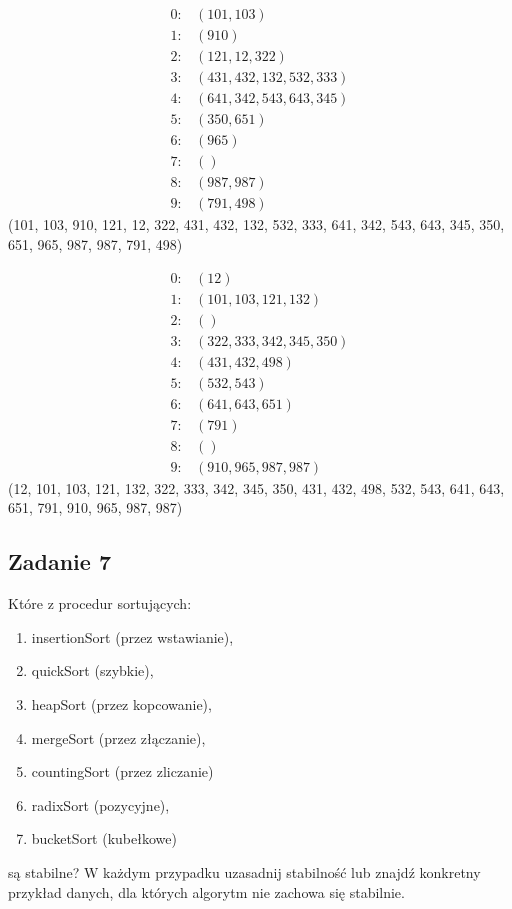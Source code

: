 \documentclass{article}
\begin{document}
\begin{align*}
    0: & \left(101, 103\right)                \\
    1: & \left(910\right)                     \\
    2: & \left(121, 12, 322\right)            \\
    3: & \left(431, 432, 132, 532, 333\right) \\
    4: & \left(641, 342, 543, 643, 345\right) \\
    5: & \left(350, 651\right)                \\
    6: & \left(965\right)                     \\
    7: & \left(\right)                        \\
    8: & \left(987, 987\right)                \\
    9: & \left(791, 498\right)
\end{align*}
(101, 103, 910, 121, 12, 322, 431, 432, 132, 532, 333, 641, 342, 543, 643, 345, 350, 651, 965, 987, 987, 791, 498)

\begin{align*}
    0: & \left(12\right)                      \\
    1: & \left(101, 103, 121, 132\right)      \\
    2: & \left(\right)                        \\
    3: & \left(322, 333, 342, 345, 350\right) \\
    4: & \left(431, 432, 498\right)           \\
    5: & \left(532, 543\right)                \\
    6: & \left(641, 643, 651\right)           \\
    7: & \left(791\right)                     \\
    8: & \left(\right)                        \\
    9: & \left(910, 965, 987, 987\right)
\end{align*}
(12, 101, 103, 121, 132, 322, 333, 342, 345, 350, 431, 432, 498, 532, 543, 641, 643, 651, 791, 910, 965, 987, 987)

\subsection*{Zadanie 7}
Które z procedur sortujących:
\begin{enumerate}[label=(\alph*)]
    \item insertionSort (przez wstawianie),
    \item quickSort (szybkie),
    \item heapSort (przez kopcowanie),
    \item mergeSort (przez złączanie),
    \item countingSort (przez zliczanie)
    \item radixSort (pozycyjne),
    \item bucketSort (kubełkowe)
\end{enumerate}
są stabilne? W każdym przypadku uzasadnij stabilność lub znajdź konkretny przykład
danych, dla których algorytm nie zachowa się stabilnie.
\end{document}
